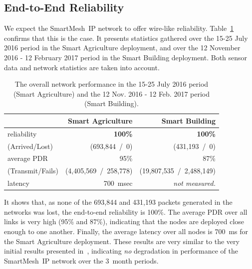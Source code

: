 \documentclass{elsarticle}
\newcommand{\smip}                {SmartMesh~IP\xspace}
\newcommand{\building}            {Smart Building\xspace}
\newcommand{\agri}                {Smart Agriculture\xspace}
\newcommand{\PEACHNUMPCKTS}       {693,844\xspace}
\newcommand{\EVANUMPCKTS}         {431,193\xspace}
\begin{document}
\subsection{End-to-End Reliability}
\label{sec:net_reliability}


We expect the \smip network to offer wire-like reliability.
Table~\ref{tab:net_stats} confirms that this is the case.
It presents statistics gathered over the 15-25 July 2016 period in the \agri deployment, and over the 12 November 2016 - 12 February 2017 period in the \building deployment.
Both sensor data and network statistics are taken into account.

\begin{table}
    \centering
    \begin{tabular}{|l|r|r|}
        \toprule
        {}                              & \agri                     & \building                    \\
        \midrule
        reliability                     & \textbf{100\%}            & \textbf{100\%}               \\
        (Arrived/Lost)                  & (\PEACHNUMPCKTS~/~0)      & (\EVANUMPCKTS~/~0)           \\
        \hline
        average PDR                     & 95\%                      &  87\%                        \\
        (Transmit/Fails)                & (4,405,569~/~258,778)     &  (19,807,535~/~2,488,149)    \\
        \hline
        latency                         & 700~msec                  &  \textit{not measured.}      \\
        \bottomrule
    \end{tabular}
    \caption{The overall network performance in the 15-25 July 2016 period (\agri) and the 12 Nov. 2016 - 12 Feb. 2017 period (\building).}
    \label{tab:net_stats}
\end{table}

It shows that, as none of the \PEACHNUMPCKTS and \EVANUMPCKTS packets generated in the networks was lost, the end-to-end reliability is 100\%.
The average PDR over all links is very high (95\% and 87\%), indicating that the nodes are deployed close enough to one another.
Finally, the average latency over all nodes is 700~ms for the \agri deployment.
These results are very similar to the very initial results presented in~\cite{watteyne16peach}, indicating \textit{no} degradation in performance of the \smip network over the 3~month periods.
\end{document}
